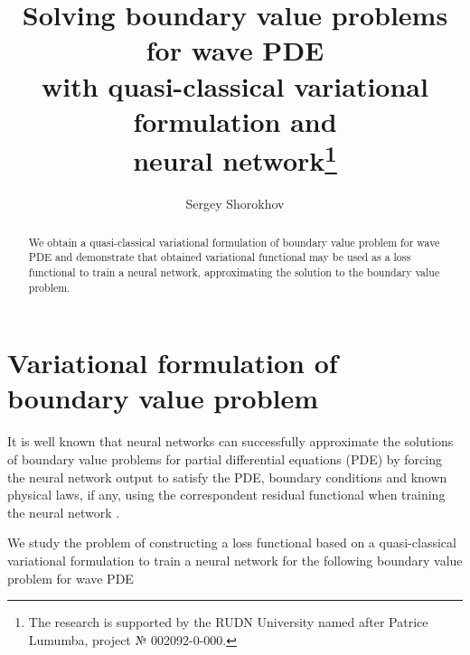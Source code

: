 \documentclass[12pt]{llncs}
\begin{document}
\fi
%
\title{Solving boundary value problems for wave PDE \\with quasi-classical variational formulation and \\neural network\thanks{The research is supported by the RUDN University named after Patrice Lumumba, project № 002092-0-000.}}
\author{Sergey Shorokhov %
}

\maketitle

\begin{abstract}
We obtain a quasi-classical variational formulation of boundary value problem for wave PDE and 
demonstrate that obtained variational functional may be used as a loss functional to train a neural network, approximating the solution to the boundary value problem.  

\end{abstract}

\section{Variational formulation of boundary value problem}

It is well known that neural networks can successfully approximate the solutions of boundary value problems for partial differential equations (PDE) by forcing the neural network output to satisfy the PDE, boundary conditions and known physical laws, if any, using the correspondent residual functional when training the neural network \cite{Raissi2019}. 
 
We study the problem of constructing a loss functional based on a quasi-classical variational formulation \cite{Filippov1994} to train a neural network for the following boundary value problem for wave PDE
\end{document}
